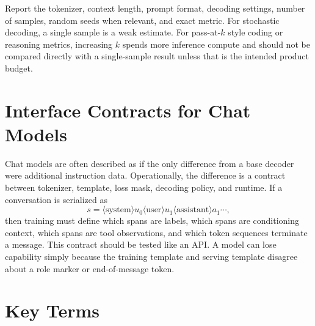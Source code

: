 Report the tokenizer, context length, prompt format, decoding settings, number of samples, random seeds when relevant, and exact metric. For stochastic decoding, a single sample is a weak estimate. For pass-at-$k$ style coding or reasoning metrics, increasing $k$ spends more inference compute and should not be compared directly with a single-sample result unless that is the intended product budget.

\section{Interface Contracts for Chat Models}
\label{sec:gpt-interface-contracts}

Chat models are often described as if the only difference from a base decoder were additional instruction data. Operationally, the difference is a contract between tokenizer, template, loss mask, decoding policy, and runtime. If a conversation is serialized as
\begin{equation}
  s = \langle \mathrm{system}\rangle u_0
      \langle \mathrm{user}\rangle u_1
      \langle \mathrm{assistant}\rangle a_1
      \cdots,
\end{equation}
then training must define which spans are labels, which spans are conditioning context, which spans are tool observations, and which token sequences terminate a message. This contract should be tested like an API. A model can lose capability simply because the training template and serving template disagree about a role marker or end-of-message token.

\section{Key Terms}
\label{sec:chapter-four-key-terms}

